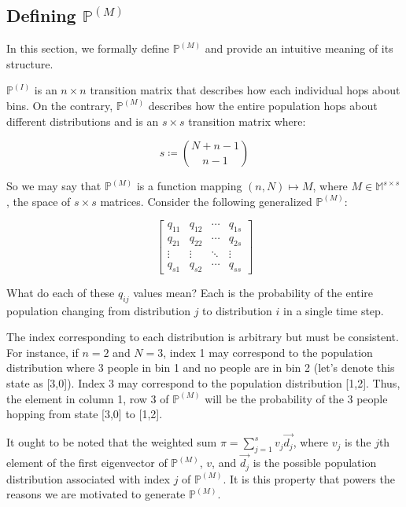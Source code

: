 \documentclass{article}
\begin{document}
\subsection{Defining $\mathbb{P}^{(M)}$} \label{sec:defpm}
In this section, we formally define $\mathbb{P}^{(M)}$ and provide an intuitive meaning of its structure.

$\mathbb{P}^{(I)}$ is an $n \times n$ transition matrix that describes how each individual hops about bins. On the contrary, $\mathbb{P}^{(M)}$ describes how the entire population hops about different distributions and is an $s \times s$ transition matrix where:

\[
s \coloneqq {N+n-1\choose n-1}
\]

So we may say that $\mathbb{P}^{(M)}$ is a function mapping $(n,N) \mapsto M$, where $M \in \mathbb{M}^{s \times s}$, the space of $s \times s$ matrices. Consider the following generalized $\mathbb{P}^{(M)}$:

\[
\begin{bmatrix}
    q_{11} & q_{12} & \cdots & q_{1s} \\
    q_{21} & q_{22} & \cdots & q_{2s} \\
    \vdots & \vdots & \ddots & \vdots \\
    q_{s1} & q_{s2} & \cdots & q_{ss}
\end{bmatrix}
\]

What do each of these $q_{ij}$ values mean? Each is the probability of the entire population changing from distribution $j$ to distribution $i$ in a single time step.

The index corresponding to each distribution is arbitrary but must be consistent. For instance, if $n=2$ and $N=3$, index 1 may correspond to the population distribution where 3 people in bin 1 and no people are in bin 2 (let's denote this state as [3,0]). Index 3 may correspond to the population distribution [1,2]. Thus, the element in column 1, row 3 of $\mathbb{P}^{(M)}$ will be the probability of the 3 people hopping from state [3,0] to [1,2].

It ought to be noted that the weighted sum $\pi = \sum^s_{j=1} v_j \vec{d_j}$, where $v_j$ is the $j$th element of the first eigenvector of $\mathbb{P}^{(M)}$, $v$, and $\vec{d_j}$ is the possible population distribution associated with index $j$ of $\mathbb{P}^{(M)}$. It is this property that powers the reasons we are motivated to generate $\mathbb{P}^{(M)}$.

\end{document}
